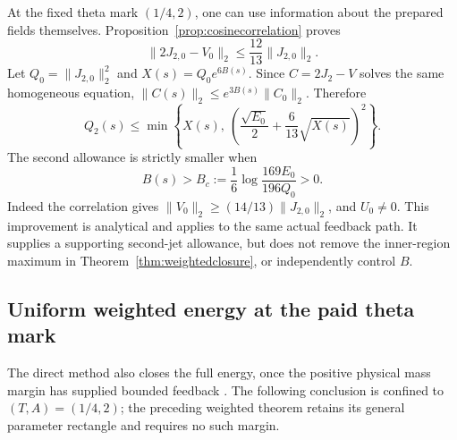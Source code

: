 \documentclass[11pt]{article}
\numberwithin{equation}{section}
\begin{document}
At the fixed theta mark $(1/4,2)$, one can use information about the
prepared fields themselves. Proposition~\ref{prop:cosinecorrelation}
proves
\[
 \|2J_{2,0}-V_0\|_2\le\frac{12}{13}\|J_{2,0}\|_2.
\]
Let $Q_0=\|J_{2,0}\|_2^2$ and $X(s)=Q_0e^{6B(s)}$.
Since $C=2J_2-V$ solves the same homogeneous equation,
$\|C(s)\|_2\le e^{3B(s)}\|C_0\|_2$. Therefore
\begin{equation}\label{eq:cosinejetallowance}
 Q_2(s)\le\min\left\{X(s),\
       \left(\frac{\sqrt{E_0}}2+\frac6{13}\sqrt{X(s)}\right)^2\right\}.
\end{equation}
The second allowance is strictly smaller when
\[
 B(s)>B_c:=\frac16\log\frac{169E_0}{196Q_0}>0.
\]
Indeed the correlation gives $\|V_0\|_2\ge(14/13)\|J_{2,0}\|_2$,
and $U_0\ne0$. This improvement is analytical and applies to the same
actual feedback path. It supplies a supporting second-jet allowance,
but does not remove the inner-region maximum in
Theorem~\ref{thm:weightedclosure}, or independently control $B$.




\subsection{Uniform weighted energy at the paid theta mark}

The direct method also closes the full energy, once the positive
physical mass margin has supplied bounded feedback
\cite{UniformResidualNote}. The following conclusion is confined to
$(T,A)=(1/4,2)$; the preceding weighted theorem retains its general
parameter rectangle and requires no such margin.
\end{document}
